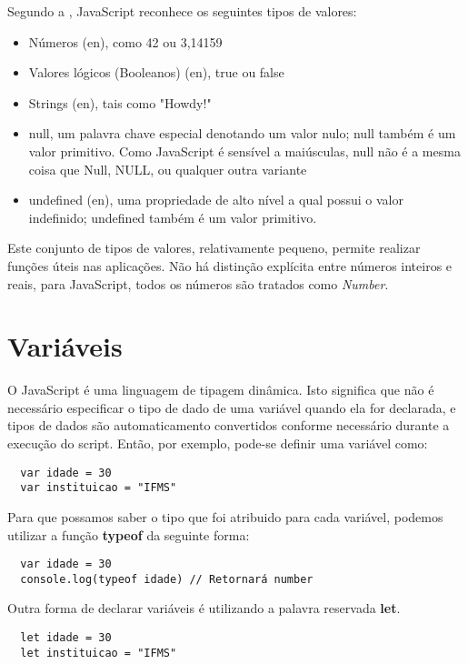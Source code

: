 Segundo a , JavaScript reconhece os seguintes tipos de valores:

\begin{itemize}
  \item Números (en), como 42 ou 3,14159
  \item Valores lógicos (Booleanos) (en), true ou false
  \item Strings (en), tais como "Howdy!"
  \item null, um palavra chave especial denotando um valor nulo; null também é um valor primitivo. Como JavaScript é sensível a maiúsculas, null não é a mesma coisa que Null, NULL, ou qualquer outra variante
  \item undefined (en), uma propriedade de alto nível a qual possui o valor 
  indefinido; undefined também é um valor primitivo.  
\end{itemize}

Este conjunto de tipos de valores, relativamente pequeno, permite realizar 
funções úteis nas aplicações. Não há distinção explícita entre números inteiros e reais, para JavaScript, todos os números são tratados como \textit{Number}. 

\section{Variáveis}

O JavaScript é uma linguagem de tipagem dinâmica. Isto significa que não é 
necessário especificar o tipo de dado de uma variável quando ela for declarada, e tipos de dados são automaticamento convertidos conforme necessário durante a execução do script. Então, por exemplo, pode-se definir uma variável como:

\begin{lstlisting}
  var idade = 30
  var instituicao = "IFMS" 
\end{lstlisting}

Para que possamos saber o tipo que foi atribuido para cada variável, podemos 
utilizar a função \textbf{typeof} da seguinte forma: 

\begin{lstlisting}
  var idade = 30
  console.log(typeof idade) // Retornará number
\end{lstlisting}

Outra forma de declarar variáveis é utilizando a palavra reservada \textbf{let}.

\begin{lstlisting}
  let idade = 30
  let instituicao = "IFMS" 
\end{lstlisting} 

